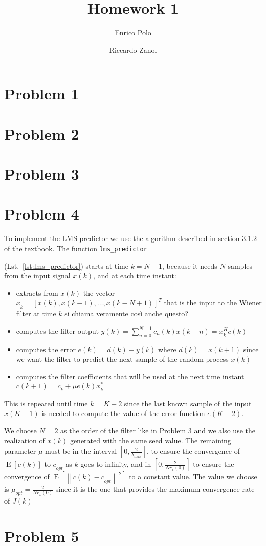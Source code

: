 \documentclass{article}
\author{Enrico Polo \and Riccardo Zanol}
\title{Homework 1}
\newcommand{\inlinecode}[1]{
  \lstinline[basicstyle=\ttfamily,keywordstyle={}]{#1}
}
\renewcommand{\vec}[1]{
  \underline{#1}
}
\newcommand{\E}[1]{
  \operatorname{E}\left[ #1 \right]
}
\newcommand{\norm}[1]{
  \left \lVert #1 \right \rVert
}
\begin{document}
\maketitle
\section*{Problem 1}
\section*{Problem 2}
\section*{Problem 3}
\section*{Problem 4}
To implement the LMS predictor we use the algorithm described in
section 3.1.2 of the textbook. The function \inlinecode{lms_predictor}
(Lst.~\ref{lst:lms_predictor}) starts at time $k=N-1$, because it
needs $N$ samples from the input signal $x(k)$, and at each
time instant:
\begin{itemize}
  \item extracts from $x(k)$ the vector $\vec{x}_k = [x(k),
    x(k-1),\dots,x(k-N+1)]^T$ that is the input to the Wiener filter
    at time $k$ {\color{red} si chiama veramente così anche questo?}
  \item computes the filter output $y(k) =
    \sum_{n=0}^{N-1}c_n(k)x(k-n) = \vec{x}_k^H\vec{c}(k)$
  \item computes the error $e(k) = d(k) - y(k)$ where $d(k) = x(k+1)$
    since we want the filter to predict the next sample of the random
    process $x(k)$
  \item computes the filter coefficients that will be used at the next
    time instant $\vec{c}(k+1) = \vec{c}_k + \mu e(k) \vec{x}_k^*$
\end{itemize}
This is repeated until time $k = K - 2$ since the last known sample of
the input $x(K-1)$ is needed to compute the value of the error
function $e(K-2)$.

We choose $N = 2$ as the order of the filter like in Problem 3 and we
also use the realization of $x(k)$ generated with the same seed
value. The remaining parameter $\mu$ must be in the interval $\left[0,
  \frac{2}{\lambda_{max}}\right]$, to ensure the convergence of
$\E{\vec{c}(k)}$ to $\vec{c}_{opt}$ as $k$ goes to infinity, and in
$\left[0, \frac{2}{Nr_x(0)}\right]$ to ensure the convergence of
$\E{\norm{\vec{c}(k) - \vec{c}_{opt}}^2}$ to a constant value. The
value we choose is $\mu_{opt} = \frac{2}{Nr_x(0)}$ since it is the one
that provides the maximum convergence rate of $J(k)$
\section*{Problem 5}
\end{document}
